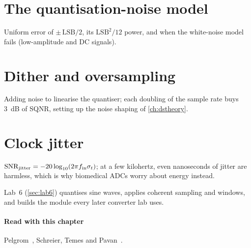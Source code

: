 \section{The quantisation-noise model}\label{sec:ch13-2}
Uniform error of $\pm\,\mathrm{LSB}/2$, its $\mathrm{LSB}^2/12$ power, and when the white-noise model fails (low-amplitude and DC signals).

\section{Dither and oversampling}\label{sec:ch13-3}
Adding noise to linearise the quantiser; each doubling of the sample rate buys \qty{3}{\deci\bel} of SQNR, setting up the noise shaping of \cref{ch:dstheory}.

\section{Clock jitter}\label{sec:ch13-4}
$\mathrm{SNR}_\mathrm{jitter} = -20\log_{10}(2\pi f_\mathrm{in}\sigma_t)$; at a few kilohertz, even nanoseconds of jitter are harmless, which is why biomedical ADCs worry about energy instead.

\begin{tryit}
Lab~6 (\cref{sec:lab6}) quantises sine waves, applies coherent sampling and windows, and builds the  module every later converter lab uses.
\end{tryit}

\paragraph{Read with this chapter} Pelgrom~\cite{pelgrom}, Schreier, Temes and Pavan~\cite{schreier}.
